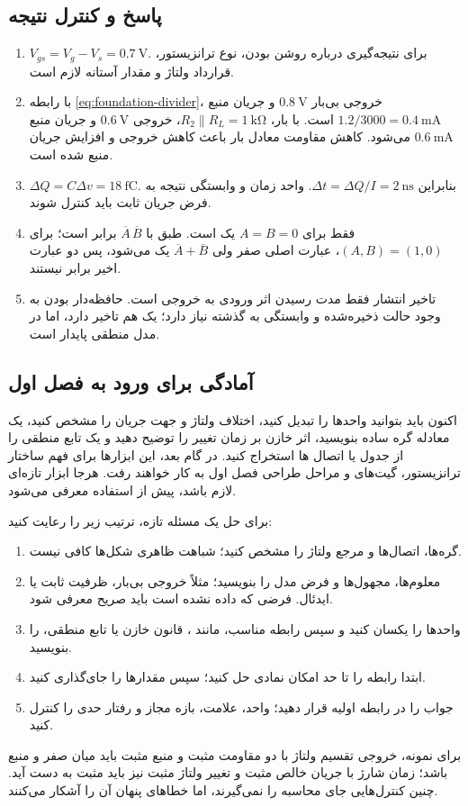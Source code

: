 \subsection{پاسخ و کنترل نتیجه}
\begin{enumerate}
\item \(V_{gs}=V_g-V_s=\qty{0.7}{\volt}\).
برای نتیجه‌گیری درباره روشن بودن، نوع ترانزیستور، قرارداد ولتاژ و مقدار آستانه لازم است.
\item با رابطه \eqref{eq:foundation-divider}، خروجی بی‌بار
\(\qty{0.8}{\volt}\) و جریان منبع
\(1.2/3000=\qty{0.4}{\milli\ampere}\) است.
با بار، \(R_2\parallel R_L=\qty{1}{\kilo\ohm}\)،
خروجی \(\qty{0.6}{\volt}\) و جریان منبع \(\qty{0.6}{\milli\ampere}\) می‌شود.
کاهش مقاومت معادل بار باعث کاهش خروجی و افزایش جریان منبع شده است.
\item \(\Delta Q=C\Delta v=\qty{18}{\femto\coulomb}\).
بنابراین \(\Delta t=\Delta Q/I=\qty{2}{\nano\second}\).
واحد زمان و وابستگی نتیجه به فرض جریان ثابت باید کنترل شوند.
\item فقط برای \(A=B=0\) یک است.
طبق  با \(\overline{A}\,\overline{B}\) برابر است؛
برای \((A,B)=(1,0)\)، عبارت اصلی صفر ولی
\(\overline{A}+\overline{B}\) یک می‌شود، پس دو عبارت اخیر برابر نیستند.
\item تاخیر انتشار فقط مدت رسیدن اثر ورودی به خروجی است.
حافظه‌دار بودن به وجود حالت ذخیره‌شده و وابستگی به گذشته نیاز دارد؛
یک  هم تاخیر دارد، اما در مدل منطقی پایدار  است.
\end{enumerate}

\subsection{آمادگی برای ورود به فصل اول}
اکنون باید بتوانید واحدها را تبدیل کنید، اختلاف ولتاژ و جهت جریان را مشخص کنید،
یک معادله گره ساده بنویسید، اثر خازن بر زمان تغییر را توضیح دهید و یک تابع منطقی
را از جدول یا اتصال ها استخراج کنید.
در گام بعد، این ابزارها برای فهم ساختار ترانزیستور، گیت‌های  و
مراحل طراحی فصل اول به کار خواهند رفت. هرجا ابزار تازه‌ای لازم باشد،
پیش از استفاده معرفی می‌شود.

برای حل یک مسئله تازه، ترتیب زیر را رعایت کنید:
\begin{enumerate}
\item گره‌ها، اتصال‌ها و مرجع ولتاژ را مشخص کنید؛ شباهت ظاهری شکل‌ها کافی نیست.
\item معلوم‌ها، مجهول‌ها و فرض مدل را بنویسید؛ مثلاً خروجی بی‌بار، ظرفیت ثابت
یا  ایدئال. فرضی که داده نشده است باید صریح معرفی شود.
\item واحدها را یکسان کنید و سپس رابطه مناسب، مانند ، قانون خازن
یا تابع منطقی، را بنویسید.
\item ابتدا رابطه را تا حد امکان نمادی حل کنید؛ سپس مقدارها را جای‌گذاری کنید.
\item جواب را در رابطه اولیه قرار دهید؛ واحد، علامت، بازه مجاز و رفتار حدی را کنترل کنید.
\end{enumerate}
برای نمونه، خروجی تقسیم ولتاژ با دو مقاومت مثبت و منبع مثبت باید میان صفر و منبع باشد؛
زمان شارژ با جریان خالص مثبت و تغییر ولتاژ مثبت نیز باید مثبت به دست آید.
چنین کنترل‌هایی جای محاسبه را نمی‌گیرند، اما خطاهای پنهان آن را آشکار می‌کنند.
